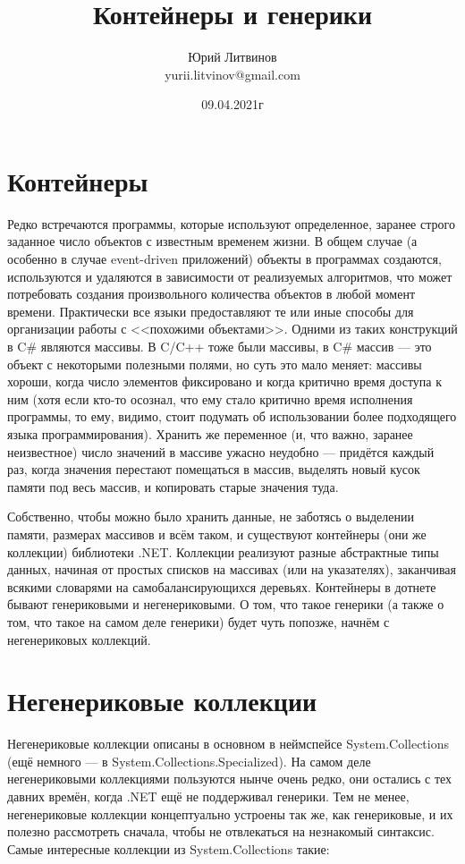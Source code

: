 \documentclass[a5paper]{article}
\title{Контейнеры и генерики}
\author{Юрий Литвинов\\\small{yurii.litvinov@gmail.com}}
\date{09.04.2021г}
\begin{document}
\maketitle
\thispagestyle{empty}

\section{Контейнеры}

Редко встречаются программы, которые используют определенное, заранее строго заданное число объектов с известным временем жизни. В общем случае (а особенно в случае event-driven приложений) объекты в программах создаются, используются и удаляются в зависимости от реализуемых алгоритмов, что может потребовать создания произвольного количества объектов в любой момент времени. Практически все языки предоставляют те или иные способы для организации работы с <<похожими объектами>>. Одними из таких конструкций в C\# являются массивы. В C/C++ тоже были массивы, в C\# массив --- это объект с некоторыми полезными полями, но суть это мало меняет: массивы хороши, когда число элементов фиксировано и когда критично время доступа к ним (хотя если кто-то осознал, что ему стало критично время исполнения программы, то ему, видимо, стоит подумать об использовании более подходящего языка программирования). Хранить же переменное (и, что важно, заранее неизвестное) число значений в массиве ужасно неудобно --- придётся каждый раз, когда значения перестают помещаться в массив, выделять новый кусок памяти под весь массив, и копировать старые значения туда.

Собственно, чтобы можно было хранить данные, не заботясь о выделении памяти, размерах массивов и всём таком, и существуют контейнеры (они же коллекции) библиотеки .NET. Коллекции реализуют разные абстрактные типы данных, начиная от простых списков на массивах (или на указателях), заканчивая всякими словарями на самобалансирующихся деревьях. Контейнеры в дотнете бывают генериковыми и негенериковыми. О том, что такое генерики (а также о том, что такое на самом деле генерики) будет чуть попозже, начнём с негенериковых коллекций.

\section{Негенериковые коллекции}

Негенериковые коллекции описаны в основном в неймспейсе System.Collections (ещё немного --- в System.Collections.Specialized). На самом деле негенериковыми коллекциями пользуются нынче очень редко, они остались с тех давних времён, когда .NET ещё не поддерживал генерики. Тем не менее, негенериковые коллекции концептуально устроены так же, как генериковые, и их полезно рассмотреть сначала, чтобы не отвлекаться на незнакомый синтаксис. Самые интересные коллекции из System.Collections такие:
\end{document}
